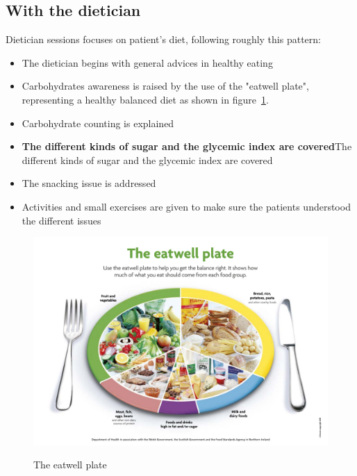 \documentclass[12pt,MSc]{muthesis}
\newcommand{\warn}[1]{\ifdefined\debug\textbf{#1}\else#1\fi}
\begin{document}
\subsection{With the dietician}
Dietician sessions focuses on patient's diet, following roughly this pattern: 
\begin{itemize}
\item The dietician begins with general advices in healthy eating
\item Carbohydrates awareness is raised by the use of the "eatwell plate", representing a healthy balanced diet as shown in figure~\ref{fig:eat_wp}.
\item Carbohydrate counting is explained
\item \warn{The different kinds of sugar %
and the glycemic index are covered}
\item The snacking issue is addressed
\item Activities and small exercises are given to make sure the patients understood the different issues
\end{itemize}

 
 
\begin{figure}[h]
  \caption{The eatwell plate}
  \centering
  \includegraphics[scale=0.43]{theeatwellplate.pdf}
  \label{fig:eat_wp}
\end{figure}



    
    
\end{document}
